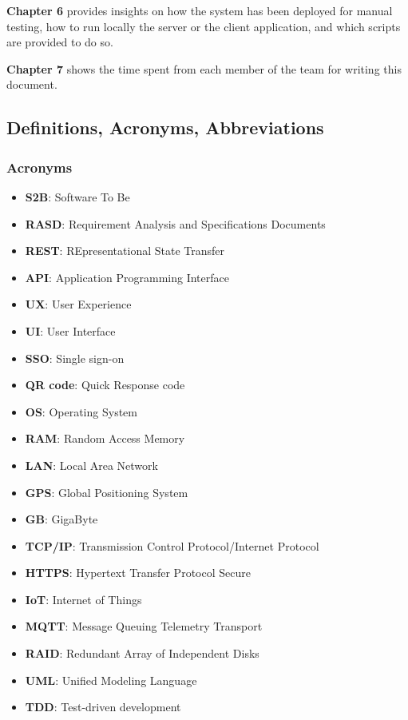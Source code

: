 \medskip

\textbf{Chapter 6} provides insights on how the system has been deployed for manual testing, how to run locally the server or the client application, and which scripts are provided to do so.

\medskip

\textbf{Chapter 7} shows the time spent from each member of the team for writing this document.

\clearpage
\subsection{Definitions, Acronyms, Abbreviations}

\subsubsection{Acronyms}

\begin{itemize}
    \item \textbf{S2B}: Software To Be
    \item \textbf{RASD}: Requirement Analysis and Specifications Documents
    \item \textbf{REST}: REpresentational State Transfer
    \item \textbf{API}: Application Programming Interface
    \item \textbf{UX}: User Experience
    \item \textbf{UI}: User Interface
    \item \textbf{SSO}: Single sign-on
    \item \textbf{QR code}: Quick Response code
    \item \textbf{OS}: Operating System
    \item \textbf{RAM}: Random Access Memory
    \item \textbf{LAN}: Local Area Network
    \item \textbf{GPS}: Global Positioning System
    \item \textbf{GB}: GigaByte
    \item \textbf{TCP/IP}: Transmission Control Protocol/Internet Protocol
    \item \textbf{HTTPS}: Hypertext Transfer Protocol Secure
    \item \textbf{IoT}: Internet of Things
    \item \textbf{MQTT}: Message Queuing Telemetry Transport
    \item \textbf{RAID}: Redundant Array of Independent Disks
    \item \textbf{UML}: Unified Modeling Language
    \item \textbf{TDD}: Test-driven development
\end{itemize}

